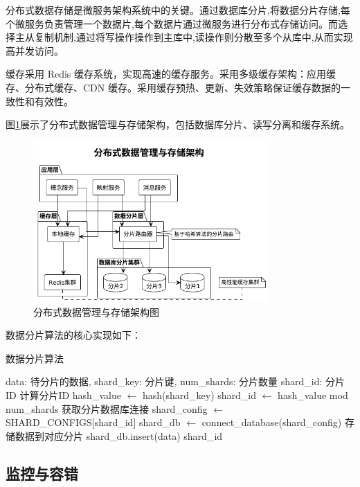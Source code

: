 分布式数据存储是微服务架构系统中的关键。通过数据库分片,将数据分片存储,每个微服务负责管理一个数据片,每个数据片通过微服务进行分布式存储访问。而选择主从复制机制,通过将写操作操作到主库中,读操作则分散至多个从库中,从而实现高并发访问。

缓存采用 Redis 缓存系统，实现高速的缓存服务。采用多级缓存架构：应用缓存、分布式缓存、CDN 缓存。采用缓存预热、更新、失效策略保证缓存数据的一致性和有效性。

图\ref{fig:data_management}展示了分布式数据管理与存储架构，包括数据库分片、读写分离和缓存系统。

\begin{figure}[H]
    \centering
    \includegraphics[width=0.8\textwidth]{chapters/fig-0/data_management.png}
    \caption{分布式数据管理与存储架构图}
    \label{fig:data_management}
\end{figure}

数据分片算法的核心实现如下：

\begin{algorithm}[H]
\caption{数据分片算法}
\begin{algorithmic}[1]
\REQUIRE data: 待分片的数据, shard\_key: 分片键, num\_shards: 分片数量
\ENSURE shard\_id: 分片ID
\STATE 计算分片ID
\STATE hash\_value $\leftarrow$ hash(shard\_key)
\STATE shard\_id $\leftarrow$ hash\_value mod num\_shards
\STATE 获取分片数据库连接
\STATE shard\_config $\leftarrow$ SHARD\_CONFIGS[shard\_id]
\STATE shard\_db $\leftarrow$ connect\_database(shard\_config)
\STATE 存储数据到对应分片
\STATE shard\_db.insert(data)
\RETURN shard\_id
\end{algorithmic}
\end{algorithm}

\subsection{监控与容错}

